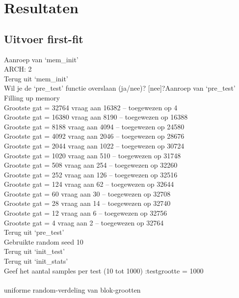 \documentclass[a4paper]{article}
\begin{document}
	\newpage

	\section{Resultaten}\label{sec:resultaten}
	\subsection{Uitvoer first-fit}\label{sec:uitvoerff}
	Aanroep van `mem\_init'\\
ARCH: 2\\
Terug uit `mem\_init'\\
Wil je de `pre\_test' functie overslaan (ja/nee)? [nee]?Aanroep van `pre\_test'\\
Filling up memory\\
Grootste gat = 32764	 vraag aan 16382 -- toegewezen op 4\\
Grootste gat = 16380	 vraag aan 8190 -- toegewezen op 16388\\
Grootste gat = 8188	 vraag aan 4094 -- toegewezen op 24580\\
Grootste gat = 4092	 vraag aan 2046 -- toegewezen op 28676\\
Grootste gat = 2044	 vraag aan 1022 -- toegewezen op 30724\\
Grootste gat = 1020	 vraag aan 510 -- toegewezen op 31748\\
Grootste gat = 508	 vraag aan 254 -- toegewezen op 32260\\
Grootste gat = 252	 vraag aan 126 -- toegewezen op 32516\\
Grootste gat = 124	 vraag aan 62 -- toegewezen op 32644\\
Grootste gat = 60	 vraag aan 30 -- toegewezen op 32708\\
Grootste gat = 28	 vraag aan 14 -- toegewezen op 32740\\
Grootste gat = 12	 vraag aan 6 -- toegewezen op 32756\\
Grootste gat = 4	 vraag aan 2 -- toegewezen op 32764\\
Terug uit `pre\_test'\\
Gebruikte random seed 10\\
Terug uit `init\_test'\\
Terug uit `init\_stats'\\
Geef het aantal samples per test (10 tot 1000) :testgrootte = 1000\\
\\
uniforme random-verdeling van blok-grootten\\
\end{document}
